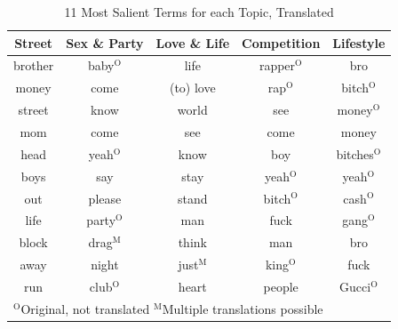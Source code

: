 \documentclass[conference]{IEEEtran}
\begin{document}
\begin{table}[htbp]
\caption{11 Most Salient Terms for each Topic, Translated}
\begin{center}
\begin{tabular}{|c|c|c|c|c|}
\hline
\textbf{Street}&\textbf{Sex \& Party}&\textbf{Love \& Life}&\textbf{Competition}&\textbf{Lifestyle} \\
\cline{1-5}
\hline
brother & baby$^{\mathrm{O}}$ & life & rapper$^{\mathrm{O}}$ & bro \\
\hline
money & come & (to) love & rap$^{\mathrm{O}}$ & bitch$^{\mathrm{O}}$ \\
\hline
street & know & world & see & money$^{\mathrm{O}}$ \\
\hline
mom & come & see & come & money \\
\hline
head & yeah$^{\mathrm{O}}$ & know & boy & bitches$^{\mathrm{O}}$ \\
\hline
boys & say & stay & yeah$^{\mathrm{O}}$ & yeah$^{\mathrm{O}}$ \\
\hline
out & please & stand & bitch$^{\mathrm{O}}$ & cash$^{\mathrm{O}}$ \\
\hline
life & party$^{\mathrm{O}}$ & man & fuck & gang$^{\mathrm{O}}$ \\
\hline
block & drag$^{\mathrm{M}}$ & think & man & bro \\
\hline
away & night & just$^{\mathrm{M}}$ & king$^{\mathrm{O}}$ & fuck \\
\hline
run & club$^{\mathrm{O}}$ & heart & people & Gucci$^{\mathrm{O}}$ \\
\hline
\hline
\multicolumn{5}{l}{$^{\mathrm{O}}$Original, not translated $^{\mathrm{M}}$Multiple translations possible}
\end{tabular}
\label{tab:topics}
\end{center}
\end{table}
\end{document}
